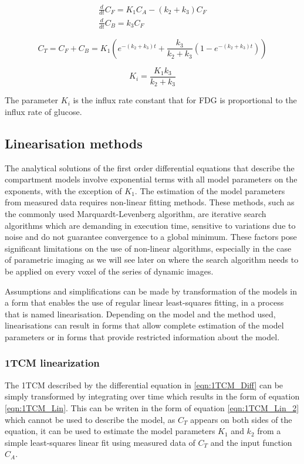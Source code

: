\begin{subequations}
\begin{align}
\frac{d}{dt}C_F = K_1 C_A - (k_2 + k_3)C_F \\ 
\frac{d}{dt}C_B = k_3 C_F  
\end{align}
\label{eqn:2TCM_Diff_k4=0}
\end{subequations}

\begin{equation}
C_T =  C_F + C_B = K_1 ( e^{-(k_2+k_3)t} + \frac{k_3}{k_2+k_3}(1-e^{-(k_2+k_3)t}))   
\label{eqn:2TCM}
\end{equation}

\begin{equation}
K_i = \frac{K_1 k_3}{k_2+k_3}
\label{eqn:FDG_Ki}
\end{equation}

The parameter $K_i$ is the influx rate constant that for FDG is proportional to the influx rate of glucose. 

\subsection{Linearisation methods}
The analytical solutions of the first order differential equations that describe the compartment models involve exponential terms with all model parameters on the exponents, with the exception of $K_1$. The estimation of the model parameters from measured data requires non-linear fitting methods. These methods, such as the commonly used Marquardt-Levenberg algorithm, are iterative search algorithms which are demanding in execution time, sensitive to variations due to noise and do not guarantee convergence to a global minimum. These factors pose significant limitations on the use of non-linear algorithms, especially in the case of parametric imaging as we will see later on where the search algorithm needs to be applied on every voxel of the series of dynamic images.\par
Assumptions and simplifications can be made by transformation of the models in a form that enables the use of regular linear least-squares fitting, in a process that is named linearisation. Depending on the model and the method used, linearisations can result in forms that allow complete estimation of the model parameters or in forms that provide restricted information about the model. 

\subsubsection{1TCM linearization}
The 1TCM described by the differential equation in \ref{eqn:1TCM_Diff} can be simply transformed by integrating over time which results in the form of equation \ref{eqn:1TCM_Lin}. This can be writen in the form of equation \ref{eqn:1TCM_Lin_2} which cannot be used to describe the model, as $C_T$ appears on both sides of the equation, it can be used to estimate the model parameters $K_1$ and $k_2$ from a simple least-squares linear fit using measured data of $C_T$ and the input function $C_A$. 

